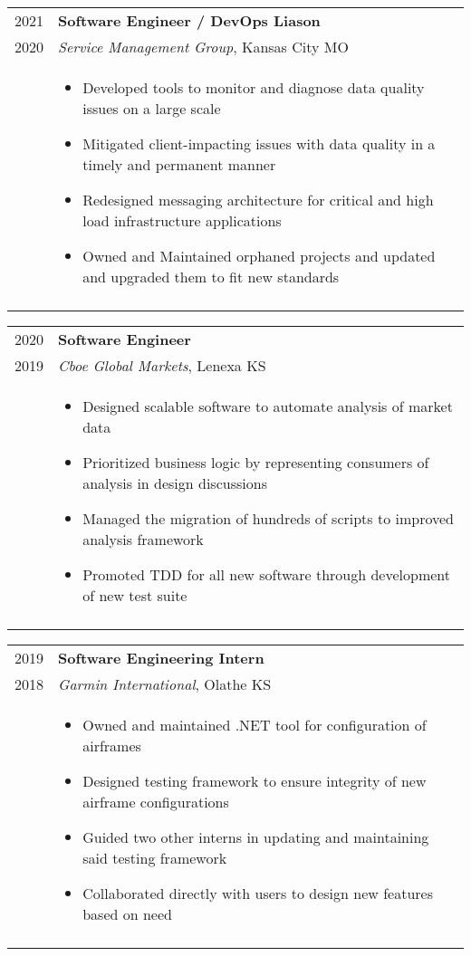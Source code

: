 \documentclass[a4paper,10pt]{article}
\newcommand{\br}{\\\multicolumn{2}{c}{}}
\begin{document}
\begin{tabular}{r|p{15cm}}
    \textsc{2021}  & \textbf{Software Engineer / DevOps Liason} \\
    \textsc{2020}  & \textit{Service Management Group}, Kansas City MO \\ &
    \begin{itemize}
    \item Developed tools to monitor and diagnose data quality issues on a large scale
    \item Mitigated client-impacting issues with data quality in a timely and permanent manner
    \item Redesigned messaging architecture for critical and high load infrastructure applications
    \item Owned and Maintained orphaned projects and updated and upgraded them to fit new standards

    \end{itemize} \br\\

\end{tabular}

\begin{tabular}{r|p{15cm}}
    \textsc{2020}   & \textbf{Software Engineer} \\
    \textsc{2019}  & \textit{Cboe Global Markets}, Lenexa KS \\ &
    \begin{itemize}
    \item Designed scalable software to automate analysis of market data
    \item Prioritized business logic by representing consumers of analysis in design discussions
    \item Managed the migration of hundreds of scripts to improved analysis framework
    \item Promoted TDD for all new software through development of new test suite

    \end{itemize} \br\\

\end{tabular}

\begin{tabular}{r|p{15cm}}
    \textsc{2019} & \textbf{Software Engineering Intern} \\
    \textsc{2018} & \textit{Garmin International}, Olathe KS \\ &
    \begin{itemize}
    \item Owned and maintained .NET tool for configuration of airframes
    \item Designed testing framework to ensure integrity of new airframe configurations
    \item Guided two other interns in updating and maintaining said testing framework
    \item Collaborated directly with users to design new features based on need
    \end{itemize} \br\\

\end{tabular}
\end{document}
